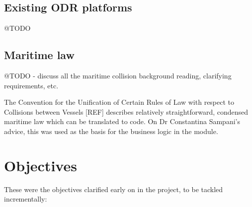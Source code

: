 \subsection{Existing ODR platforms}

@TODO

\subsection{Maritime law}

@TODO - discuss all the maritime collision background reading, clarifying requirements, etc.

The Convention for the Unification of Certain Rules of Law with respect to Collisions between Vessels [REF] describes relatively straightforward, condensed maritime law which can be translated to code. On Dr Constantina Sampani's advice, this was used as the basis for the business logic in the module. %

\section{Objectives}

These were the objectives clarified early on in the project, to be tackled incrementally:

